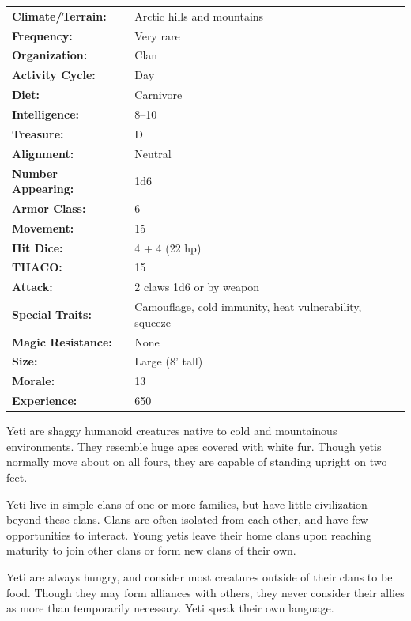 \begin{multicols}{2}
\begin{minipage}{\columnwidth}
\noindent \begin{tabular}{p{}p{}}
\textbf{Climate/Terrain:}	& Arctic hills and mountains	\\
\textbf{Frequency:} 		& Very rare	\\
\textbf{Organization:} 		& Clan	\\
\textbf{Activity Cycle:} 	& Day	\\
\textbf{Diet:} 				& Carnivore	\\
\textbf{Intelligence:} 		& 8--10	\\
\textbf{Treasure:} 			& D	\\
\textbf{Alignment:} 		& Neutral	\\
\hline
\textbf{Number Appearing:} 	& 1d6	\\
\textbf{Armor Class:} 		& 6	\\
\textbf{Movement:} 			& 15	\\
\textbf{Hit Dice:} 			& 4 + 4 (22 hp)	\\
\textbf{THACO:} 			& 15	\\
\textbf{Attack:} 			& 2 claws 1d6 or by weapon	\\
\textbf{Special Traits:} & Camouflage, cold immunity, heat vulnerability, squeeze	\\
\textbf{Magic Resistance:} 	& None	\\
\textbf{Size:} 				& Large (8' tall)	\\
\textbf{Morale:} 			& 13	\\
\textbf{Experience:} 		& 650	\\ %
\end{tabular}

\end{minipage}

Yeti are shaggy humanoid creatures native to cold and mountainous environments. They resemble huge apes covered with white fur. Though yetis normally move about on all fours, they are capable of standing upright on two feet.

Yeti live in simple clans of one or more families, but have little civilization beyond these clans. Clans are often isolated from each other, and have few opportunities to interact. Young yetis leave their home clans upon reaching maturity to join other clans or form new clans of their own.

Yeti are always hungry, and consider most creatures outside of their clans to be food. Though they may form alliances with others, they never consider their allies as more than temporarily necessary. Yeti speak their own language.


\end{multicols}
